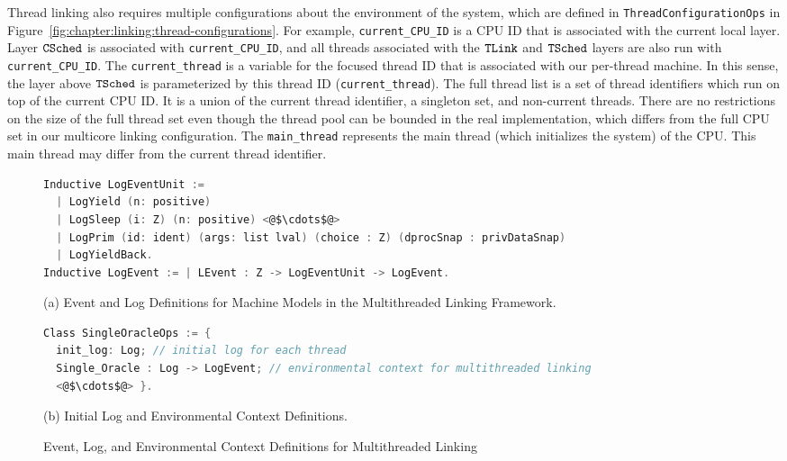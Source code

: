Thread linking also requires multiple configurations about the environment of the system, which are defined in  
\lstinline$ThreadConfigurationOps$ in Figure~\ref{fig:chapter:linking:thread-configurations}.
For example, \lstinline$current_CPU_ID$ is a CPU ID that is 
associated with the current local layer.
Layer ${{\mathrm{\texttt{CSched}}}}$ is associated with \lstinline$current_CPU_ID$, 
and all threads associated with the ${{\mathrm{\texttt{TLink}}}}$ and ${{\mathrm{\texttt{TSched}}}}$ layers 
are also run with  \lstinline$current_CPU_ID$.
The \lstinline$current_thread$ is a variable for the focused thread ID that is associated with our per-thread machine.
In this sense, the layer above ${{\mathrm{\texttt{TSched}}}}$ is parameterized by this thread ID (\lstinline$current_thread$). 
The full thread list is a set of thread identifiers which run on top of the current CPU ID. 
It is a union of the current thread identifier, a singleton set, 
and non-current threads. 
There are no restrictions on the size of the full thread set even though 
the thread pool can be bounded in the real implementation, which differs from the full CPU set in our multicore linking configuration.
The \lstinline$main_thread$ represents the main thread (which initializes the system) of the CPU. 
This main thread may differ from the current thread identifier.

\begin{figure}
\begin{lstlisting}[language=C]
Inductive LogEventUnit :=
  | LogYield (n: positive)
  | LogSleep (i: Z) (n: positive) <@$\cdots$@>
  | LogPrim (id: ident) (args: list lval) (choice : Z) (dprocSnap : privDataSnap) 
  | LogYieldBack.
Inductive LogEvent := | LEvent : Z -> LogEventUnit -> LogEvent.
\end{lstlisting}
\begin{center}
(a) Event and Log Definitions for Machine Models in the Multithreaded Linking Framework.
\end{center}
\begin{lstlisting}[language=C, morekeywords={Class}]
Class SingleOracleOps := {
  init_log: Log; // initial log for each thread
  Single_Oracle : Log -> LogEvent; // environmental context for multithreaded linking
  <@$\cdots$@> }.
\end{lstlisting}
\begin{center}
(b) Initial Log and Environmental Context Definitions.
\end{center}
\caption{Event, Log, and Environmental Context Definitions for Multithreaded Linking}
\label{fig:chapter:linking:event-and-log-for-multithreaded-linking}
\end{figure}


